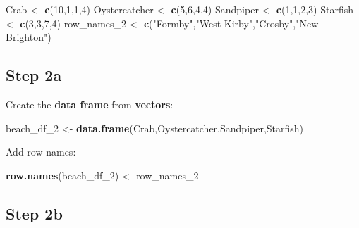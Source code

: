 \documentclass[]{book}
\newenvironment{Shaded}{\begin{snugshade}}{\end{snugshade}}
\newcommand{\KeywordTok}[1]{\textcolor[rgb]{0.13,0.29,0.53}{\textbf{#1}}}
\newcommand{\DecValTok}[1]{\textcolor[rgb]{0.00,0.00,0.81}{#1}}
\newcommand{\StringTok}[1]{\textcolor[rgb]{0.31,0.60,0.02}{#1}}
\newcommand{\NormalTok}[1]{#1}
\begin{document}
\begin{Shaded}
\begin{Highlighting}[]
\NormalTok{Crab <-}\StringTok{ }\KeywordTok{c}\NormalTok{(}\DecValTok{10}\NormalTok{,}\DecValTok{1}\NormalTok{,}\DecValTok{1}\NormalTok{,}\DecValTok{4}\NormalTok{)}
\NormalTok{Oystercatcher <-}\StringTok{ }\KeywordTok{c}\NormalTok{(}\DecValTok{5}\NormalTok{,}\DecValTok{6}\NormalTok{,}\DecValTok{4}\NormalTok{,}\DecValTok{4}\NormalTok{)}
\NormalTok{Sandpiper <-}\StringTok{ }\KeywordTok{c}\NormalTok{(}\DecValTok{1}\NormalTok{,}\DecValTok{1}\NormalTok{,}\DecValTok{2}\NormalTok{,}\DecValTok{3}\NormalTok{)}
\NormalTok{Starfish <-}\StringTok{ }\KeywordTok{c}\NormalTok{(}\DecValTok{3}\NormalTok{,}\DecValTok{3}\NormalTok{,}\DecValTok{7}\NormalTok{,}\DecValTok{4}\NormalTok{)}
\NormalTok{row_names_}\DecValTok{2}\NormalTok{ <-}\StringTok{ }\KeywordTok{c}\NormalTok{(}\StringTok{"Formby"}\NormalTok{,}\StringTok{"West Kirby"}\NormalTok{,}\StringTok{"Crosby"}\NormalTok{,}\StringTok{"New Brighton"}\NormalTok{)}
\end{Highlighting}
\end{Shaded}

\subsection{Step 2a}\label{step-2a-1}

Create the \textbf{data frame} from \textbf{vectors}:

\begin{Shaded}
\begin{Highlighting}[]
\NormalTok{beach_df_}\DecValTok{2}\NormalTok{ <-}\StringTok{ }\KeywordTok{data.frame}\NormalTok{(Crab,Oystercatcher,Sandpiper,Starfish)}
\end{Highlighting}
\end{Shaded}

Add row names:

\begin{Shaded}
\begin{Highlighting}[]
\KeywordTok{row.names}\NormalTok{(beach_df_}\DecValTok{2}\NormalTok{) <-}\StringTok{ }\NormalTok{row_names_}\DecValTok{2}
\end{Highlighting}
\end{Shaded}

\subsection{Step 2b}\label{step-2b-1}
\end{document}
